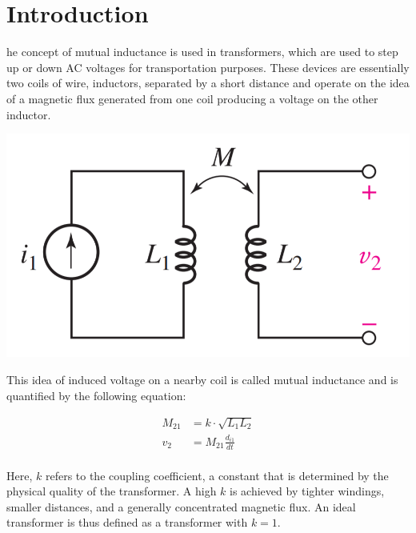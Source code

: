 \documentclass[journal]{IEEEtran}
\begin{document}
\section{Introduction}

\lowercase{he} concept of mutual inductance is used in transformers, which are used to step up or down AC voltages for transportation purposes. These devices are essentially two coils of wire, inductors, separated by a short distance and operate on the idea of a magnetic flux generated from one coil producing a voltage on the other inductor.

\begingroup
    \centering
    \medskip
    \includegraphics[width=\columnwidth]{images/labx_1.PNG}
    \label{fig:transformer}
    \medskip
\endgroup


\noindent This idea of induced voltage on a nearby coil is called mutual inductance and is quantified by the following equation: 

\begin{equation}
    \begin{split}
        M_{21} & = k \cdot \sqrt{L_{1}L_{2}} \\
       v_{2} & = M_{21}\frac{d_{i1}}{dt}\\
    \end{split}
    \label{eq:mutual}
\end{equation}

\noindent Here, $k$ refers to the coupling coefficient, a constant that is determined by the physical quality of the transformer. A high $k$ is achieved by tighter windings, smaller distances, and a generally concentrated magnetic flux. An ideal transformer is thus defined as a transformer with $k = 1$.
\end{document}
